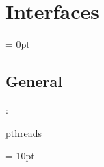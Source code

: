 
\section{Interfaces} 


\parskip = 0pt

\vspace{3mm} \subsection*{General}

: 

pthreads
\vspace{2mm}

\vspace{5mm}\parskip = 10pt 
